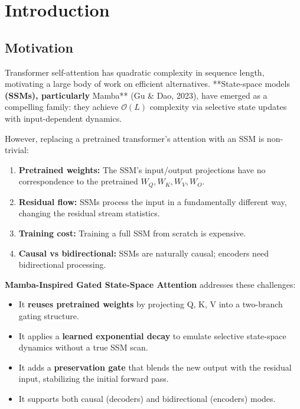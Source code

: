 \section{Introduction}

\subsection{Motivation}

Transformer self-attention has quadratic complexity in sequence length, 
motivating a large body of work on efficient alternatives. **State-space 
models\textbf{ (SSMs), particularly }Mamba** (Gu \& Dao, 2023), have emerged as a 
compelling family: they achieve $\mathcal{O}(L)$ complexity via selective 
state updates with input-dependent dynamics.

However, replacing a pretrained transformer's attention with an SSM is 
non-trivial:

\begin{enumerate}
\item \textbf{Pretrained weights:} The SSM's input/output projections have no
  correspondence to the pretrained $W_Q, W_K, W_V, W_O$.
\item \textbf{Residual flow:} SSMs process the input in a fundamentally different way,
  changing the residual stream statistics.
\item \textbf{Training cost:} Training a full SSM from scratch is expensive.
\item \textbf{Causal vs bidirectional:} SSMs are naturally causal; encoders need
  bidirectional processing.

\end{enumerate}
\textbf{Mamba-Inspired Gated State-Space Attention} addresses these challenges:

\begin{itemize}
\item It \textbf{reuses pretrained weights} by projecting Q, K, V into a two-branch
  gating structure.
\item It applies a \textbf{learned exponential decay} to emulate selective state-space
  dynamics without a true SSM scan.
\item It adds a \textbf{preservation gate} that blends the new output with the residual
  input, stabilizing the initial forward pass.
\item It supports both causal (decoders) and bidirectional (encoders) modes.

\end{itemize}
